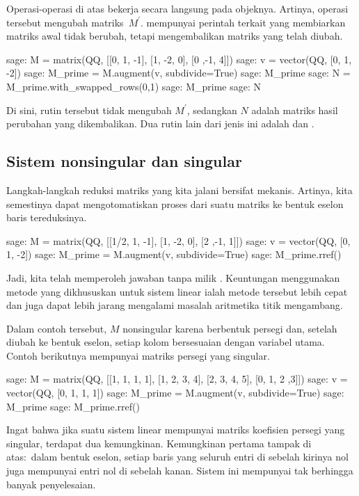 Operasi-operasi di atas
bekerja secara langsung pada objeknya.
Artinya, operasi tersebut mengubah matriks~$M^\prime$.
\Sage{} mempunyai perintah terkait yang membiarkan matriks awal tidak berubah,
tetapi mengembalikan matriks yang telah diubah.
\begin{sagecommandline}
sage: M = matrix(QQ, [[0, 1, -1], [1, -2, 0], [0 ,-1, 4]])
sage: v = vector(QQ, [0, 1, -2])
sage: M_prime = M.augment(v, subdivide=True) 
sage: M_prime
sage: N = M_prime.with_swapped_rows(0,1)
sage: M_prime
sage: N      
\end{sagecommandline}
Di sini, rutin tersebut tidak mengubah $M^\prime$, sedangkan $N$ adalah
matriks hasil perubahan yang dikembalikan.
Dua rutin lain dari jenis ini adalah 
dan .




\subsection{Sistem nonsingular dan singular}
Langkah-langkah reduksi matriks yang kita jalani bersifat mekanis.
Artinya, kita semestinya dapat mengotomatiskan proses dari suatu matriks
ke bentuk eselon baris tereduksinya.
\begin{sagecommandline}
sage: M = matrix(QQ, [[1/2, 1, -1], [1, -2, 0], [2 ,-1, 1]])
sage: v = vector(QQ, [0, 1, -2])
sage: M_prime = M.augment(v, subdivide=True) 
sage: M_prime.rref()
\end{sagecommandline}
Jadi, kita telah memperoleh jawaban tanpa  milik \Sage{}.
Keuntungan menggunakan metode yang dikhususkan
untuk sistem linear ialah metode tersebut lebih cepat dan juga dapat lebih jarang
mengalami masalah aritmetika titik mengambang.

Dalam contoh tersebut, $M$ nonsingular karena berbentuk
persegi dan, setelah diubah ke bentuk eselon, setiap
kolom bersesuaian dengan variabel utama.
Contoh berikutnya mempunyai
matriks persegi yang singular. 
\begin{sagecommandline}
sage: M = matrix(QQ, [[1, 1, 1, 1], [1, 2, 3, 4], [2, 3, 4, 5], [0, 1, 2 ,3]]) 
sage: v = vector(QQ, [0, 1, 1, 1]) 
sage: M_prime = M.augment(v, subdivide=True)
sage: M_prime
sage: M_prime.rref()
\end{sagecommandline}
Ingat bahwa jika suatu sistem linear mempunyai matriks koefisien persegi
yang singular, terdapat dua kemungkinan.
Kemungkinan pertama tampak di atas:~dalam bentuk eselon,
setiap baris yang seluruh entri di sebelah kirinya nol
juga mempunyai entri nol di sebelah kanan.
Sistem ini mempunyai tak berhingga banyak penyelesaian.

